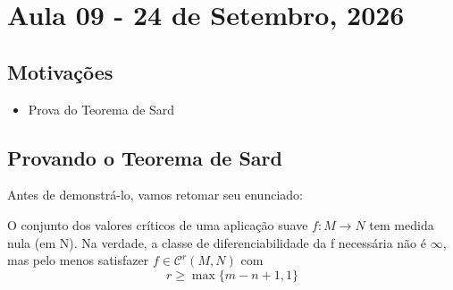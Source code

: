\documentclass[../differential_topology.tex]{subfiles}
\begin{document}
\section{Aula 09 - 24 de Setembro, 2026}
\subsection{Motivações}
\begin{itemize}
	\item Prova do Teorema de Sard
\end{itemize}
\subsection{Provando o Teorema de Sard}
Antes de demonstrá-lo, vamos retomar seu enunciado:
\begin{theorem*}
	O conjunto dos valores críticos de uma aplicação suave \(f:M\rightarrow N\) tem medida nula (em N).
	Na verdade, a classe de diferenciabilidade da f necessária não é \(\infty\), mas pelo menos satisfazer \(f\in \mathcal{C}^{r}(M, N)\) com
	\[
		r\geq \max\limits\{m-n+1, 1\}
	\]
\end{theorem*}
\end{document}
